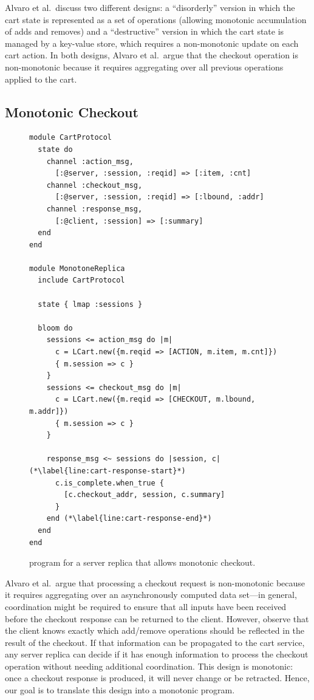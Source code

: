 Alvaro et al.\ discuss two different designs: a ``disorderly'' version in which
the cart state is represented as a set of operations (allowing monotonic
accumulation of adds and removes) and a ``destructive'' version in which the
cart state is managed by a key-value store, which requires a non-monotonic
update on each cart action. In both designs, Alvaro et al.\ argue that the
checkout operation is non-monotonic because it requires aggregating over all
previous operations applied to the cart.

\subsection{Monotonic Checkout}
\begin{figure}[t]
\begin{scriptsize}

\begin{lstlisting}
module CartProtocol
  state do
    channel :action_msg,
      [:@server, :session, :reqid] => [:item, :cnt]
    channel :checkout_msg,
      [:@server, :session, :reqid] => [:lbound, :addr]
    channel :response_msg,
      [:@client, :session] => [:summary]
  end
end

module MonotoneReplica
  include CartProtocol

  state { lmap :sessions }

  bloom do
    sessions <= action_msg do |m|
      c = LCart.new({m.reqid => [ACTION, m.item, m.cnt]})
      { m.session => c }
    }
    sessions <= checkout_msg do |m|
      c = LCart.new({m.reqid => [CHECKOUT, m.lbound, m.addr]})
      { m.session => c }
    }

    response_msg <~ sessions do |session, c| (*\label{line:cart-response-start}*)
      c.is_complete.when_true {
        [c.checkout_addr, session, c.summary]
      }
    end (*\label{line:cart-response-end}*)
  end
end
\end{lstlisting}
\end{scriptsize}
\caption{\lang program for a server replica that allows monotonic checkout.}
\label{fig:monotone-cart}
\end{figure}

Alvaro et al.\ argue that processing a checkout request is non-monotonic because
it requires aggregating over an asynchronously computed data set---in general,
coordination might be required to ensure that all inputs have been received
before the checkout response can be returned to the client. However, observe
that the client knows exactly which add/remove operations should be reflected in
the result of the checkout. If that information can be propagated to the cart
service, any server replica can decide if it has enough information to process
the checkout operation without needing additional coordination. This design is
monotonic: once a checkout response is produced, it will never change or be
retracted. Hence, our goal is to translate this design into a monotonic \lang
program.

